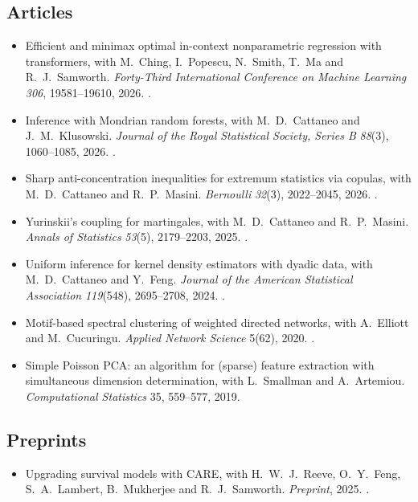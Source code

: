 \documentclass{wgu-cv}
\begin{document}
\subsection{Articles}{}
\begin{itemize}

  \item Efficient and minimax optimal in-context
    nonparametric regression with transformers,
    with M.\ Ching, I.\ Popescu, N.\ Smith,
    T.\ Ma and R.\ J.\ Samworth.
    \emph{Forty-Third International Conference on Machine Learning}
    \emph{306}, 19581--19610, 2026.
    .

  \item Inference with Mondrian random forests,
    with M.\ D.\ Cattaneo and J.\ M.\ Klusowski.
    \emph{Journal of the Royal Statistical Society, Series B}
    \emph{88}(3), 1060--1085, 2026.
    .

  \item Sharp anti-concentration inequalities
    for extremum statistics via copulas,
    with M.\ D.\ Cattaneo and R.\ P.\ Masini.
    \emph{Bernoulli}
    \emph{32}(3), 2022--2045, 2026.
    .

  \item Yurinskii's coupling for martingales,
    with M.\ D.\ Cattaneo and R.\ P.\ Masini.
    \emph{Annals of Statistics}
    \emph{53}(5), 2179--2203, 2025.
    .

  \item Uniform inference for kernel density estimators with dyadic data,
    with M.\ D.\ Cattaneo and Y.\ Feng.
    \emph{Journal of the American Statistical Association}
    \emph{119}(548), 2695--2708, 2024.
    .

  \item Motif-based spectral clustering of weighted directed networks,
    with A.\ Elliott and M.\ Cucuringu.
    \emph{Applied Network Science}
    5(62), 2020.
    .

  \item Simple Poisson PCA: an algorithm for (sparse) feature extraction
    with simultaneous dimension determination,
    with L.\ Smallman and A.\ Artemiou.
    \emph{Computational Statistics}
    35, 559--577, 2019.

\end{itemize}

\subsection{Preprints}{}
\begin{itemize}

  \item Upgrading survival models with CARE,
    with H.\ W.\ J.\ Reeve, O.\ Y.\ Feng,
    S.\ A.\ Lambert, B.\ Mukherjee and R.\ J.\ Samworth.
    \emph{Preprint}, 2025.
    .

\end{itemize}
\end{document}
